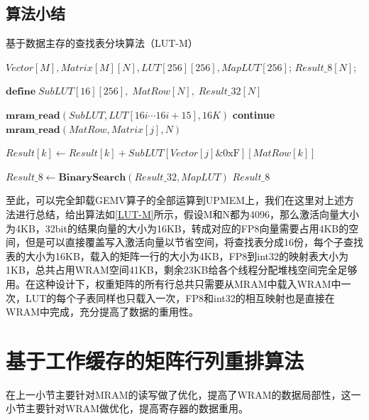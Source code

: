 \subsection{算法小结}

\begin{algorithm}[!htbp]
    \caption{基于数据主存的查找表分块算法（LUT-M）}
    \label{LUT-M}
    \begin{algorithmic}[1]
        \Require $Vector[M], Matrix[M][N], LUT[256][256], MapLUT[256]$; %
        \Ensure $Result\_8[N]$; %

        \State $\textbf{define}\; SubLUT[16][256],\;MatRow[N],\;Result\_32[N]$

            \State $\textbf{mram\_read}(SubLUT, LUT[16i \cdots 16i + 15], 16K)$
            \Comment{\textcolor{blue}{parallel read}}
                    \State \textbf{continue}
                \EndIf
                \State $\textbf{mram\_read}(MatRow, Matrix[j], N)$
                \Comment{\textcolor{blue}{parallel in N for each tasklet}}
                
                \Comment{\textcolor{blue}{parallel in N for each tasklet}}
                    \State $Result[k] \gets Result[k] + SubLUT[Vector[j] \& \text{0xF}][MatRow[k]]$
                \EndFor
            \EndFor
        \EndFor

        \State $Result\_8 \gets \textbf{BinarySearch}(Result\_32, MapLUT)$
        \Comment{\textcolor{blue}{parallel in N}}
        \State \Return $Result\_8$
    \end{algorithmic}
\end{algorithm}

至此，可以完全卸载GEMV算子的全部运算到UPMEM上，我们在这里对上述方法进行总结，给出算法如\ref{LUT-M}所示，假设M和N都为4096，那么激活向量大小为4KB，32bit的结果向量的大小为16KB，转成对应的FP8向量需要占用4KB的空间，但是可以直接覆盖写入激活向量以节省空间，将查找表分成16份，每个子查找表的大小为16KB，载入的矩阵一行的大小为4KB，FP8到int32的映射表大小为1KB，总共占用WRAM空间41KB，剩余23KB给各个线程分配堆栈空间完全足够用。在这种设计下，权重矩阵的所有行总共只需要从MRAM中载入WRAM中一次，LUT的每个子表同样也只载入一次，FP8和int32的相互映射也是直接在WRAM中完成，充分提高了数据的重用性。

\section{基于工作缓存的矩阵行列重排算法}
在上一小节主要针对MRAM的读写做了优化，提高了WRAM的数据局部性，这一小节主要针对WRAM做优化，提高寄存器的数据重用。

